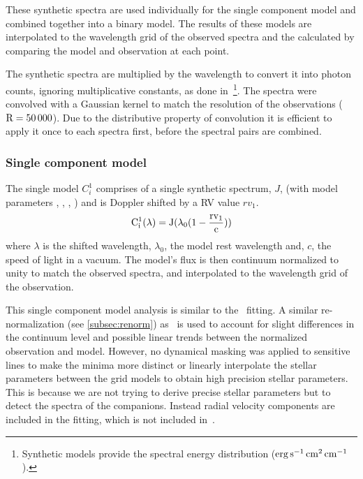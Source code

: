These synthetic spectra are used individually for the single component model and combined together into a binary model.
The results of these models are interpolated to the wavelength grid of the observed spectra and the \textchisquared{} calculated by comparing the model and observation at each point.


{\red{} The synthetic spectra are multiplied by the wavelength to convert it into photon counts, ignoring multiplicative constants, as done in~\citet{figueira_radial_2016}\footnote{Synthetic models provide the spectral energy distribution (\(\rm erg\,s^{-1}\,cm^{2}\,cm^{-1}\)).}.
The spectra were convolved with a Gaussian kernel to match the resolution of the observations (\(\rm R=50\,000\)).
Due to the distributive property of convolution it is efficient to apply it once to each spectra first, before the spectral pairs are combined.}


\subsubsection{Single component model}
\label{subsubsec:single-model}
The single model \(C^{1}_{i}\) comprises of a single synthetic spectrum, \(J\), (with model parameters \Teff{}, \logg{}, \feh{}, \alphafe{}) \alphafe{} and is Doppler shifted by a {RV} value \({rv}_1\).
\begin{equation}
\rm C^{1}_{i}(\lambda) = J(\lambda_0(1-\frac{{rv}_1}{c}))
\end{equation}
where \(\lambda\) is the shifted wavelength, \(\lambda_0\), the model rest wavelength and, \(c\), the speed of light in a vacuum.
The model's flux is then continuum normalized to unity to match the observed spectra, and interpolated to the wavelength grid of the observation.

This single component model analysis is similar to the~\citet{passegger_fundamental_2016} \textchisquared{} fitting.
A similar re-normalization (see \cref{subsec:renorm}) as~\citet{passegger_fundamental_2016} is used to account for slight differences in the continuum level and possible linear trends between the normalized observation and model.
However, no dynamical masking was applied to sensitive lines to make the \textchisquared{} minima more distinct or linearly interpolate the stellar parameters between the grid models to obtain high precision stellar parameters.
This is because we are not trying to derive precise stellar parameters but to detect the spectra of the companions.
Instead radial velocity components are included in the \textchisquared{} fitting, which is not included in~\citet{passegger_fundamental_2016}.



